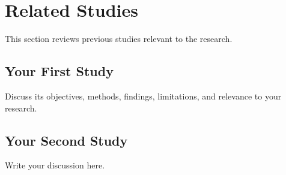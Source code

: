 \section{Related Studies}
\label{sec:related-studies}

This section reviews previous studies relevant
to the research.

\subsection{Your First Study}

Discuss its objectives, methods, findings, limitations,
and relevance to your research.

\subsection{Your Second Study}

Write your discussion here.
